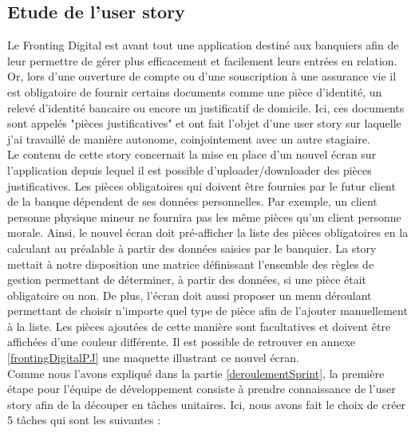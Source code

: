 \subsection{Etude de l'user story}

	Le Fronting Digital est avant tout une application destiné aux banquiers afin de leur permettre de gérer plus efficacement et facilement leurs entrées en relation. Or, lors d'une ouverture de compte ou d'une souscription à une assurance vie il est obligatoire de fournir certains documents comme une pièce d'identité, un relevé d'identité bancaire ou encore un justificatif de domicile. Ici, ces documents sont appelés "pièces justificatives" et ont fait l'objet d'une user story sur laquelle j'ai travaillé de manière autonome, coinjointement avec un autre stagiaire. \\
	
	Le contenu de cette story concernait la mise en place d'un nouvel écran sur l'application depuis lequel il est possible d'uploader/downloader des pièces justificatives. Les pièces obligatoires qui doivent être fournies par le futur client de la banque dépendent de ses données personnelles. Par exemple, un client personne physique mineur ne fournira pas les même pièces qu'un client personne morale. Ainsi, le nouvel écran doit pré-afficher la liste des pièces obligatoires en la calculant au préalable à partir des données saisies par le banquier. La story mettait à notre disposition une matrice définissant l'ensemble des règles de gestion permettant de déterminer, à partir des données, si une pièce était obligatoire ou non. De plus, l'écran doit aussi proposer un menu déroulant permettant de choisir n'importe quel type de pièce afin de l'ajouter manuellement à la liste. Les pièces ajoutées de cette manière sont facultatives et doivent être affichées d'une couleur différente. Il est possible de retrouver en annexe \ref{frontingDigitalPJ} une maquette illustrant ce nouvel écran. \\

	Comme nous l'avons expliqué dans la partie \ref{deroulementSprint}, la première étape pour l'équipe de développement consiste à prendre connaissance de l'user story afin de la découper en tâches unitaires. Ici, nous avons fait le choix de créer 5 tâches qui sont les suivantes :
	

